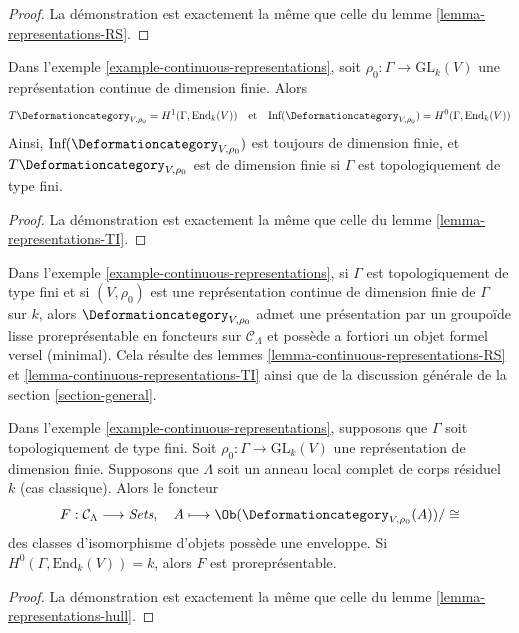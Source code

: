 \begin{proof}
La démonstration est exactement la même que celle du
lemme \ref{lemma-representations-RS}.
\end{proof}

\begin{lemma}
\label{lemma-continuous-representations-TI}
Dans l'exemple \ref{example-continuous-representations}, soit
$\rho_0 : \Gamma \to \text{GL}_k(V)$ une représentation continue
de dimension finie. Alors
$$
T\Deformationcategory_{V, \rho_0} = H^1(\Gamma, \text{End}_k(V))
\quad\text{et}\quad
\text{Inf}(\Deformationcategory_{V, \rho_0}) = H^0(\Gamma, \text{End}_k(V))
$$
Ainsi, $\text{Inf}(\Deformationcategory_{V, \rho_0})$
est toujours de dimension finie,
et $T\Deformationcategory_{V, \rho_0}$ est de dimension finie
si $\Gamma$ est topologiquement de type fini.
\end{lemma}

\begin{proof}
La démonstration est exactement la même que celle du
lemme \ref{lemma-representations-TI}.
\end{proof}

\noindent
Dans l'exemple \ref{example-continuous-representations}, si $\Gamma$
est topologiquement de type fini
et si $(V, \rho_0)$ est une représentation continue de dimension finie de $\Gamma$
sur $k$, alors $\Deformationcategory_{V, \rho_0}$
admet une présentation par un groupoïde lisse proreprésentable en foncteurs
sur $\mathcal{C}_\Lambda$
et possède a fortiori un objet formel versel (minimal). Cela résulte
des lemmes \ref{lemma-continuous-representations-RS} et
\ref{lemma-continuous-representations-TI}
ainsi que de la discussion générale de la section \ref{section-general}.

\begin{lemma}
\label{lemma-continuous-representations-hull}
Dans l'exemple \ref{example-continuous-representations}, supposons que $\Gamma$
soit topologiquement de type fini.
Soit $\rho_0 : \Gamma \to \text{GL}_k(V)$ une représentation de dimension finie.
Supposons que $\Lambda$ soit un anneau local complet de corps résiduel $k$
(cas classique). Alors le foncteur
$$
F : \mathcal{C}_\Lambda \longrightarrow \textit{Sets},\quad
A \longmapsto \Ob(\Deformationcategory_{V, \rho_0}(A))/\cong
$$
des classes d'isomorphisme d'objets possède une enveloppe. Si
$H^0(\Gamma, \text{End}_k(V)) = k$, alors $F$ est
proreprésentable.
\end{lemma}

\begin{proof}
La démonstration est exactement la même que celle du
lemme \ref{lemma-representations-hull}.
\end{proof}



